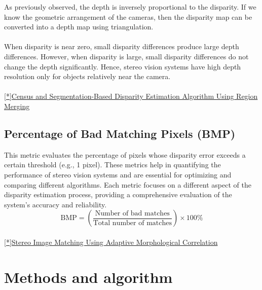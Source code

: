 \documentclass[22pt]{report}
\begin{document}
        As previously observed, the depth is inversely proportional to the disparity. If we know the geometric arrangement of the cameras, then the disparity map can be converted into a depth map using triangulation.\\\\
        When disparity is near zero, small disparity differences produce large depth differences. However, when disparity is large, small disparity differences do not change the depth significantly. Hence, stereo vision systems have high depth resolution only for objects relatively near the camera.\\\\        \href{https://www.researchgate.net/publication/281994923_Census_and_Segmentation-Based_Disparity_Estimation_Algorithm_Using_Region_Merging}{[*]Census and Segmentation-Based Disparity Estimation Algorithm Using Region Merging}
        
    \section{Percentage of Bad Matching Pixels (BMP)}
        This metric evaluates the percentage of pixels whose disparity error exceeds a certain threshold (e.g., 1 pixel).
        These metrics help in quantifying the performance of stereo vision systems and are essential for optimizing and comparing different algorithms. Each metric focuses on a different aspect of the disparity estimation process, providing a comprehensive evaluation of the system's accuracy and reliability.
        \[
        \text{BMP} = \left( \frac{\text{Number of bad matches}}{\text{Total number of matches}} \right) \times 100\%
        \]\\
        \href{https://www.researchgate.net/publication/365655310_Stereo_Image_Matching_Using_Adaptive_Morphological_Correlation}{[*]Stereo Image Matching Using Adaptive Morphological Correlation}


\chapter{Methods and algorithm}
\end{document}
